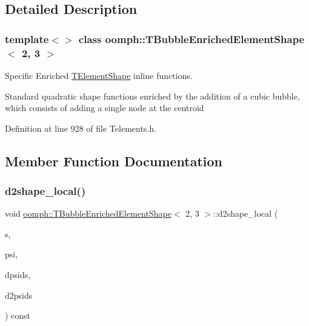 \subsection{Detailed Description}
\subsubsection*{template$<$$>$\newline
class oomph\+::\+T\+Bubble\+Enriched\+Element\+Shape$<$ 2, 3 $>$}

Specific Enriched \hyperlink{classoomph_1_1TElementShape}{T\+Element\+Shape} inline functions. 

Standard quadratic shape functions enriched by the addition of a cubic bubble, which consists of adding a single node at the centroid 

Definition at line 928 of file Telements.\+h.



\subsection{Member Function Documentation}
\mbox{\label{classoomph_1_1TBubbleEnrichedElementShape_3_012_00_013_01_4_a31ee07d9b89d6a8e6372f6a916c40de8}} 
\subsubsection{\texorpdfstring{d2shape\+\_\+local()}{d2shape\_local()}}
{\footnotesize\ttfamily void \hyperlink{classoomph_1_1TBubbleEnrichedElementShape}{oomph\+::\+T\+Bubble\+Enriched\+Element\+Shape}$<$ 2, 3 $>$\+::d2shape\+\_\+local (\begin{DoxyParamCaption}\item[{const \hyperlink{classoomph_1_1Vector}{Vector}$<$ double $>$ \&}]{s,  }\item[{\hyperlink{classoomph_1_1Shape}{Shape} \&}]{psi,  }\item[{\hyperlink{classoomph_1_1DShape}{D\+Shape} \&}]{dpsids,  }\item[{\hyperlink{classoomph_1_1DShape}{D\+Shape} \&}]{d2psids }\end{DoxyParamCaption}) const\hspace{0.3cm}{\ttfamily [inline]}}

